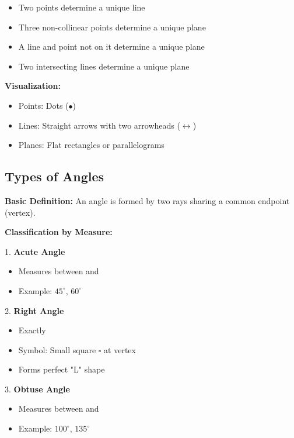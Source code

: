\documentclass{article} %
\begin{document}
\begin{itemize}
    \item Two points determine a unique line
    \item Three non-collinear points determine a unique plane
    \item A line and point not on it determine a unique plane
    \item Two intersecting lines determine a unique plane
\end{itemize}

\textbf{Visualization:}
\begin{itemize}
    \item Points: Dots ($\bullet$)
    \item Lines: Straight arrows with two arrowheads ($\leftrightarrow$)
    \item Planes: Flat rectangles or parallelograms
\end{itemize}

\subsection{Types of Angles}

\textbf{Basic Definition:}
An angle is formed by two rays sharing a common endpoint (vertex).

\textbf{Classification by Measure:}

1. \textbf{Acute Angle}
\begin{itemize}
    \item Measures between  and 
    \item Example: $45^\circ$, $60^\circ$
\end{itemize}

2. \textbf{Right Angle} 
\begin{itemize}
    \item Exactly 
    \item Symbol: Small square $\square$ at vertex
    \item Forms perfect "L" shape
\end{itemize}

3. \textbf{Obtuse Angle}
\begin{itemize}
    \item Measures between  and 
    \item Example: $100^\circ$, $135^\circ$
\end{itemize}
\end{document}
